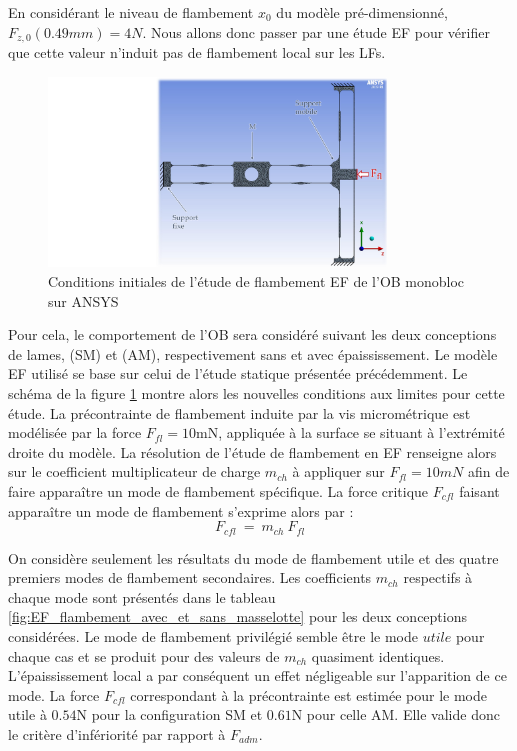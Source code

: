 En considérant le niveau de flambement $x_0$ du modèle pré-dimensionné, $F_{z,0}(0.49mm)=4N$. Nous allons donc passer par une étude EF pour vérifier que cette valeur n'induit pas de flambement local sur les LFs.
\begin{figure}
\begin{center}
    \captionsetup{justification=centering}
	\includegraphics[trim={11cm 0cm 0cm 0cm},clip, width=0.8\textwidth]{../Chap3/Figure/EF_flambement_CI.pdf}
	\caption{Conditions initiales de l'étude de flambement EF de l'OB monobloc sur ANSYS}
	\label{fig:EF_flambement_CI}
\end{center}
\end{figure}

Pour cela, le comportement de l'OB sera considéré suivant les deux conceptions de lames, (SM) et (AM), respectivement sans et avec épaississement. Le modèle EF utilisé se base sur celui de l'étude statique présentée précédemment. Le schéma de la figure \ref{fig:EF_flambement_CI} montre alors les nouvelles conditions aux limites pour cette étude. La précontrainte de flambement induite par la vis micrométrique est modélisée par la force $F_{fl}=10$mN, appliquée à la surface se situant à l'extrémité droite du modèle. La résolution de l'étude de flambement en EF renseigne alors sur le coefficient multiplicateur de charge $m_{ch}$ à appliquer sur $F_{fl}=10mN$ afin de faire apparaître un mode de flambement spécifique. La force critique $F_{cfl}$ faisant apparaître un mode de flambement s'exprime alors par :
\begin{equation}
	F_{cfl}\ =\ m_{ch}\ F_{fl}
\label{eq:Force flambement EF}
\end{equation}

On considère seulement les résultats du mode de flambement utile et des quatre premiers modes de flambement secondaires. Les coefficients $m_{ch}$ respectifs à chaque mode sont présentés dans le tableau \ref{fig:EF_flambement_avec_et_sans_masselotte} pour les deux conceptions considérées. Le mode de flambement privilégié semble être le mode $utile$ pour chaque cas et se produit pour des valeurs de $m_{ch}$ quasiment identiques. L'épaississement local a par conséquent un effet négligeable sur l'apparition de ce mode. La force $F_{cfl}$ correspondant à la précontrainte est estimée pour le mode utile à $0.54$N pour la configuration SM et $0.61$N pour celle AM. Elle valide donc le critère d'infériorité par rapport à $F_{adm}$.	

